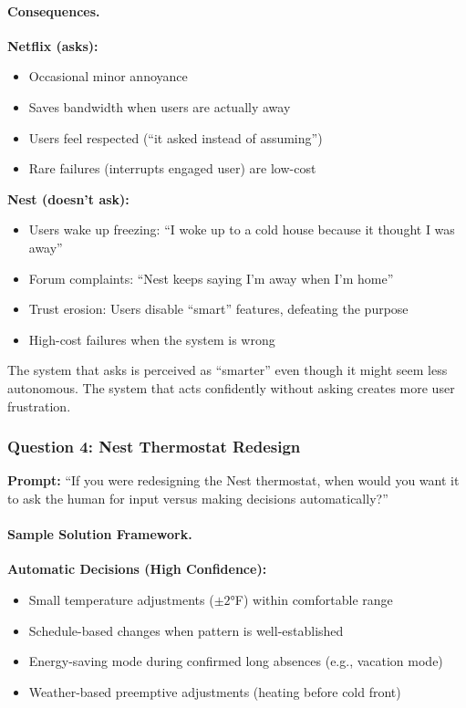 \paragraph{Consequences.}

\textbf{Netflix (asks):}
\begin{itemize}
    \item Occasional minor annoyance
    \item Saves bandwidth when users are actually away
    \item Users feel respected (``it asked instead of assuming'')
    \item Rare failures (interrupts engaged user) are low-cost
\end{itemize}

\textbf{Nest (doesn't ask):}
\begin{itemize}
    \item Users wake up freezing: ``I woke up to a cold house because it thought I was away''
    \item Forum complaints: ``Nest keeps saying I'm away when I'm home''
    \item Trust erosion: Users disable ``smart'' features, defeating the purpose
    \item High-cost failures when the system is wrong
\end{itemize}

\begin{keyconcept}
The system that asks is perceived as ``smarter'' even though it might seem less autonomous. The system that acts confidently without asking creates more user frustration.
\end{keyconcept}

\subsubsection{Question 4: Nest Thermostat Redesign}

\textbf{Prompt:} ``If you were redesigning the Nest thermostat, when would you want it to ask the human for input versus making decisions automatically?''

\paragraph{Sample Solution Framework.}

\textbf{Automatic Decisions (High Confidence):}
\begin{itemize}
    \item Small temperature adjustments ($\pm 2$°F) within comfortable range
    \item Schedule-based changes when pattern is well-established
    \item Energy-saving mode during confirmed long absences (e.g., vacation mode)
    \item Weather-based preemptive adjustments (heating before cold front)
\end{itemize}


